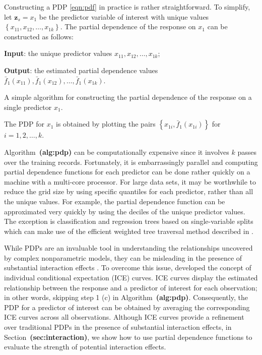 \documentclass[12pt]{article}
\def\ref#1{\textbf{(#1)}}
\begin{document}
Constructing a PDP \eqref{eqn:pdf} in practice is rather straightforward. To simplify, let $\boldsymbol{z}_s = x_1$ be the predictor variable of interest with unique values $\left\{x_{11}, x_{12}, \dots, x_{1k}\right\}$. The partial dependence of the response on $x_1$ can be constructed as follows:
\begin{algorithm}
  \textbf{Input}: the unique predictor values $x_{11}, x_{12}, \dots, x_{1k}$;

  \textbf{Output}: the estimated partial dependence values $\bar{f}_1\left(x_{11}\right), \bar{f}_1\left(x_{12}\right), \dots, \bar{f}_1\left(x_{1k}\right)$. \BlankLine
    \BlankLine
    \BlankLine
  \caption{A simple algorithm for constructing the partial dependence of the response on a single predictor $x_1$. \label{alg:pdp}}
\end{algorithm}
\newline
The PDP for $x_1$ is obtained by plotting the pairs $\left\{x_{1i}, \bar{f}_1\left(x_{1i}\right)\right\}$ for $i = 1, 2, \dotsc, k$. 

Algorithm~\ref{alg:pdp} can be computationally expensive since it involves $k$ passes over the training records. Fortunately, it is embarrassingly parallel and computing partial dependence functions for each predictor can be done rather quickly on a machine with a multi-core processor. For large data sets, it may be worthwhile to reduce the grid size by using specific quantiles for each predictor, rather than all the unique values. For example, the partial dependence function can be approximated very quickly by using the deciles of the unique predictor values. The exception is classification and regression trees based on single-variable splits which can make use of the efficient weighted tree traversal method described in \citet{friedman-2001-greedy}.

While PDPs are an invaluable tool in understanding the relationships uncovered by complex nonparametric models, they can be misleading in the presence of substantial interaction effects \citep{goldstein-peeking-2015}. To overcome this issue, \citeauthor{goldstein-peeking-2015} developed the concept of individual conditional expectation (ICE) curves. ICE curves display the estimated relationship between the response and a predictor of interest for each observation; in other words, skipping step 1 (c) in Algorithm~\ref{alg:pdp}. Consequently, the PDP for a predictor of interest can be obtained by averaging the corresponding ICE curves across all observations. Although ICE curves provide a refinement over traditional PDPs in the presence of substantial interaction effects, in Section~\ref{sec:interaction}, we show how to use partial dependence functions to evaluate the strength of potential interaction effects.
\end{document}
